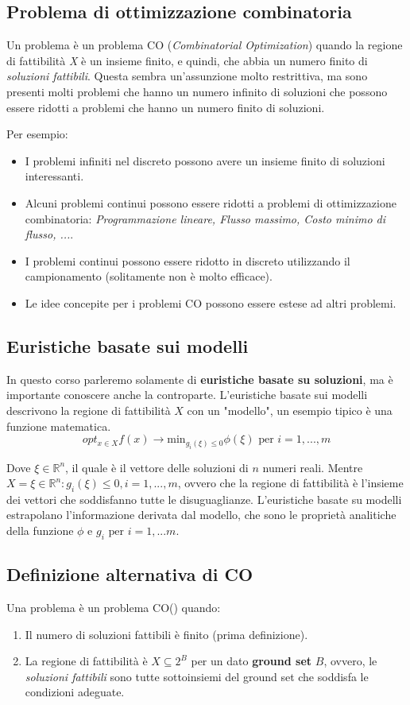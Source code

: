 \documentclass{article}
\begin{document}
\subsection{Problema di ottimizzazione combinatoria}
Un problema è un problema CO (\textit{Combinatorial Optimization}) quando la regione di fattibilità \textit{X} è un insieme finito, e quindi, che abbia un numero
finito di \textit{soluzioni fattibili}. Questa sembra un'assunzione molto restrittiva, ma sono presenti molti
problemi che hanno un numero infinito di soluzioni che possono essere ridotti a problemi che hanno un numero finito di soluzioni.

Per esempio:
\begin{itemize}
    \item I problemi infiniti nel discreto possono avere un insieme finito di soluzioni interessanti.
    \item Alcuni problemi continui possono essere ridotti a problemi di ottimizzazione combinatoria: \textit{Programmazione lineare, Flusso massimo, Costo minimo di flusso, ...}.
    \item I problemi continui possono essere ridotto in discreto utilizzando il campionamento (solitamente non è molto efficace).
    \item Le idee concepite per i problemi CO possono essere estese ad altri problemi.
\end{itemize}

\subsection{Euristiche basate sui modelli}
In questo corso parleremo solamente di \textbf{euristiche basate su soluzioni}, ma è importante conoscere anche la controparte.
L'euristiche basate sui modelli descrivono la regione di fattibilità $X$ con un "modello", un esempio tipico è una funzione matematica.
$$opt_{x\in X} f(x) \rightarrow \text{min}_{g_i(\xi)\leq 0}\phi(\xi) \text{ per } i=1,...,m$$

Dove $\xi \in \mathbb{R}^n$, il quale è il vettore delle soluzioni di $n$ numeri reali. Mentre $X={\xi \in \mathbb{R}^n : g_i(\xi)\leq 0, i=1,...,m}$, ovvero che la
regione di fattibilità è l'insieme dei vettori che soddisfanno tutte le disuguaglianze.
L'euristiche basate su modelli estrapolano l'informazione derivata dal modello, che sono le proprietà analitiche della funzione $\phi$ e $g_i \text{ per } i=1,...m$.

\subsection{Definizione alternativa di CO}
Una problema è un problema CO() quando:
\begin{enumerate}
    \item Il numero di soluzioni fattibili è finito (prima definizione).
    \item La regione di fattibilità è $X\subseteq 2^B$ per un dato \textbf{ground set} $B$, ovvero, le \textit{soluzioni fattibili} sono tutte sottoinsiemi del ground set che
          soddisfa le condizioni adeguate.
\end{enumerate}
\end{document}
